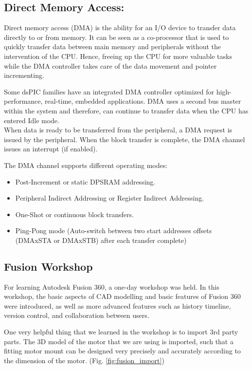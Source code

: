 \subsection{Direct Memory Access:}

Direct memory access (DMA) is the ability for an I/O device to transfer data directly to or from memory.  It can be seen as a co-processor that is used to quickly transfer data between main memory and peripherals without the intervention of the CPU. Hence, freeing up the CPU for more valuable tasks while the DMA controller takes care of the data movement and pointer incrementing.

Some dsPIC families have an integrated DMA controller optimized for high-performance, real-time, embedded applications. DMA uses a second bus master within the system and therefore, can continue to transfer data when the CPU has entered Idle mode.\\
When data is ready to be transferred from the peripheral, a DMA request is issued by the peripheral. When the block transfer is complete, the DMA channel issues an interrupt (if enabled).

The DMA channel supports different operating modes:
\begin{itemize}
    \item Post-Increment or static DPSRAM addressing.
    \item Peripheral Indirect Addressing or Register Indirect Addressing.
    \item One-Shot or continuous block transfers.
    \item Ping-Pong mode (Auto-switch between two start addresses offsets (DMAxSTA or DMAxSTB) after each transfer complete)
\end{itemize}




\subsection{Fusion Workshop}
For learning Autodesk Fusion 360, a one-day workshop was held. In this workshop, the basic aspects of CAD modelling and basic features of Fusion 360 were introduced, as well as more advanced features such as history timeline, version control, and collaboration between users.

One very helpful thing that we learned in the workshop is to import 3rd party parts. The 3D model of the motor that we are using is imported, such that a fitting motor mount can be designed very precisely and accurately according to the dimension of the motor. (Fig. \ref{fig:fusion_import})

